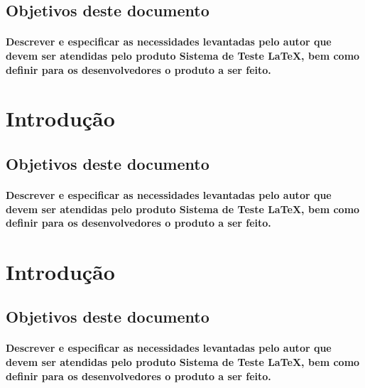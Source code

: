 \documentclass{article}
\begin{document}
	\subsection{Objetivos deste documento}
		\paragraph{Descrever e especificar as necessidades levantadas pelo autor que devem ser atendidas pelo produto Sistema de Teste LaTeX, bem como definir para os desenvolvedores o produto a ser feito.}



\newpage

\section{Introdução}
	\subsection{Objetivos deste documento}
		\paragraph{Descrever e especificar as necessidades levantadas pelo autor que devem ser atendidas pelo produto Sistema de Teste LaTeX, bem como definir para os desenvolvedores o produto a ser feito.}



\newpage

\section{Introdução}
	\subsection{Objetivos deste documento}
		\paragraph{Descrever e especificar as necessidades levantadas pelo autor que devem ser atendidas pelo produto Sistema de Teste LaTeX, bem como definir para os desenvolvedores o produto a ser feito.}
\end{document}
